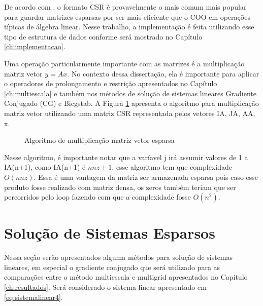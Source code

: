 De acordo com \citet{solverlinear}, o formato CSR é provavelmente o mais comum mais popular para guardar matrizes esparsas por ser mais eficiente que o COO em operações típicas de álgebra linear. Nesse trabalho, a implementação é feita utilizando esse tipo de estrutura de dados conforme será mostrado no Capítulo \ref{ch:implementacao}.

Uma operação particularmente importante com as matrizes é a multiplicação matriz vetor $y = Ax$. No contexto dessa dissertação, ela é importante para aplicar o operadores de prolongamento e restrição apresentados no Capítulo \ref{ch:multiescala} e também nos métodos de solução de sistemas lineares Gradiente Conjugado (CG) e Bicgstab. A Figura \ref{fig:algoritmomatmult} apresenta o algoritmo para multiplicação matriz vetor utilizando uma matriz CSR representada pelos vetores IA, JA, AA, x.



\begin{figure}
    \centering
\noindent{}
    \caption{Algoritmo de multiplicação matriz vetor esparsa }
    \label{fig:algoritmomatmult}
\end{figure}


Nesse algoritmo, é importante notar que a varíavel j irá assumir valores de 1 a IA(n+1), como IA(n+1) é $nnz + 1$, esse algoritmo tem que complexidade $O(nnz)$. Essa é uma vantagem da matriz ser armazenada esparsa pois caso esse produto fosse realizado com matriz densa, os zeros também teriam que ser percorridos pelo loop fazendo com que a complexidade fosse $O(n^2)$. 


\section{Solução de Sistemas Esparsos} \label{sec:cg}

Nessa seção serão apresentados alguma métodos para solução de sistemas lineares, em especial o gradiente conjugado que será utilizado para as comparações entre o método multiescala e multigrid apresentados no Capítulo \ref{ch:resultados}. Será considerado o sistema linear apresentado em \eqref{eq:sistemalinear4}.

